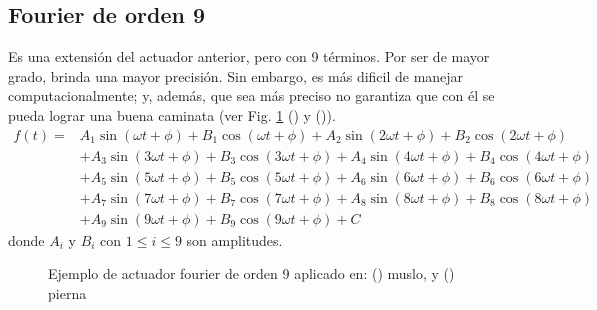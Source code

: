 \documentclass{article}
\begin{document}
\subsection{Fourier de orden 9}
Es una extensi\'on del actuador anterior, pero con 9 t\'erminos. Por ser de mayor grado, brinda una mayor precisi\'on. Sin embargo, es m\'as dificil de manejar computacionalmente; y, adem\'as, que sea m\'as preciso no garantiza que con \'el se pueda lograr una buena caminata  (ver Fig. \ref{actuadores:fourier9} () y ()).\\
\begin{equation}
\begin{split}
  f(t) = &   A_1 \sin(\omega t+\phi)+B_1 \cos(\omega t+\phi)+A_2 \sin(2\omega t+\phi)+B_2 \cos(2\omega t+\phi) \\
  &+A_3 \sin(3\omega t+\phi)+B_3 \cos(3\omega t+\phi)+A_4 \sin(4\omega t+\phi)+B_4 \cos(4\omega t+\phi) \\ 
  &+A_5 \sin(5\omega t+\phi)+B_5 \cos(5\omega t+\phi)+A_6 \sin(6\omega t+\phi)+B_6 \cos(6\omega t+\phi) \\
  &+A_7 \sin(7\omega t+\phi)+B_7 \cos(7\omega t+\phi)+A_8 \sin(8\omega t+\phi)+B_8 \cos(8\omega t+\phi) \\
  &+A_9 \sin(9\omega t+\phi)+B_9 \cos(9\omega t+\phi) + C
\end{split}
\end{equation}
donde $A_{i}$ y $B_{i}$ con $1 \leq i \leq 9$ son amplitudes.
\begin{figure}[H]%
  \centering
  \captionsetup{justification=centering}
  \caption{Ejemplo de actuador fourier de orden 9 aplicado en: (\protect{}) muslo, y (\protect{}) pierna}%
  \label{actuadores:fourier9} %
\end{figure}
\end{document}
